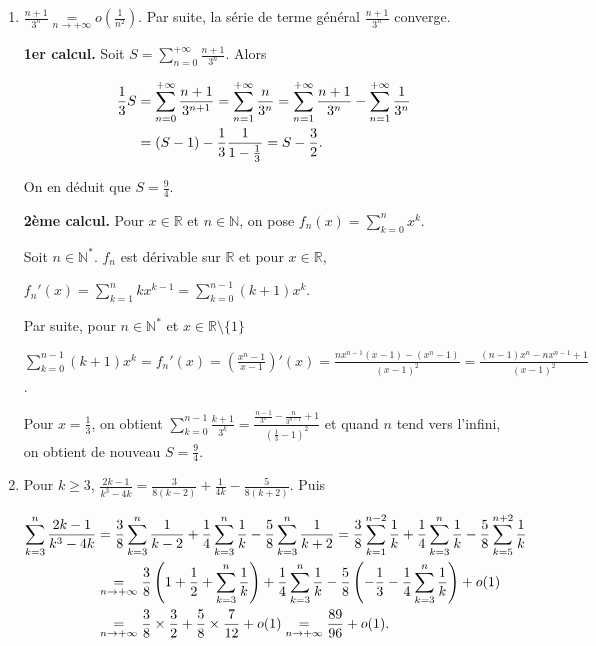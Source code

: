 \documentclass[11pt,a4paper]{article}
\newcommand{\Nn}{\mathbb{N}} \newcommand{\N}{\mathbb{N}}
\newcommand{\Rr}{\mathbb{R}} \newcommand{\R}{\mathbb{R}}
\begin{document}
\begin{enumerate}
 \item  $\frac{n+1}{3^n}\underset{n\rightarrow+\infty}{=}o\left(\frac{1}{n^2}\right)$. Par suite, la série de terme général $\frac{n+1}{3^n}$ converge.

\textbf{1er calcul.} Soit $S=\sum_{n=0}^{+\infty}\frac{n+1}{3^n}$. Alors

\begin{align*}\ensuremath
\frac{1}{3}S&=\sum_{n=0}^{+\infty}\frac{n+1}{3^{n+1}}=\sum_{n=1}^{+\infty}\frac{n}{3^{n}}=\sum_{n=1}^{+\infty}\frac{n+1}{3^{n}}-\sum_{n=1}^{+\infty}\frac{1}{3^{n}}\\
 &=(S-1)-\frac{1}{3}\frac{1}{1-\frac{1}{3}}=S-\frac{3}{2}.
\end{align*}

On en déduit que $S=\frac{9}{4}$.

\begin{center}
\end{center}

\textbf{2ème calcul.} Pour $x\in\Rr$ et $n\in\Nn$, on pose $f_n(x)=\sum_{k=0}^{n}x^k$.

Soit $n\in\Nn^*$. $f_n$ est dérivable sur $\Rr$ et pour $x\in\Rr$,

\begin{center}
$f_n'(x)=\sum_{k=1}^{n}kx^{k-1}=\sum_{k=0}^{n-1}(k+1)x^k$.
\end{center}

Par suite, pour $n\in\Nn^*$ et $x\in\Rr\setminus\{1\}$

\begin{center}
$\sum_{k=0}^{n-1}(k+1)x^k=f_n'(x)=\left(\frac{x^n-1}{x-1}\right)'(x)=\frac{nx^{n-1}(x-1)-(x^n-1)}{(x-1)^2}=\frac{(n-1)x^n-nx^{n-1}+1}{(x-1)^2}$.
\end{center}

Pour $x=\frac{1}{3}$, on obtient  $\sum_{k=0}^{n-1}\frac{k+1}{3^k}=\frac{\frac{n-1}{3^n}-\frac{n}{3^{n-1}}+1}{\left(\frac{1}{3}-1\right)^2}$ et quand $n$ tend vers l'infini, on obtient de nouveau $S=\frac{9}{4}$.

\item  Pour $k\geqslant3$, $\frac{2k-1}{k^3-4k}=\frac{3}{8(k-2)}+\frac{1}{4k}-\frac{5}{8(k+2)}$. Puis

\begin{align*}\ensuremath
\sum_{k=3}^{n}\frac{2k-1}{k^3-4k}&=\frac{3}{8}\sum_{k=3}^{n}\frac{1}{k-2}+\frac{1}{4}\sum_{k=3}^{n}\frac{1}{k}-\frac{5}{8}\sum_{k=3}^{n}\frac{1}{k+2}=\frac{3}{8}\sum_{k=1}^{n-2}\frac{1}{k}+\frac{1}{4}\sum_{k=3}^{n}\frac{1}{k}-\frac{5}{8}\sum_{k=5}^{n+2}\frac{1}{k}\\
 &\underset{n\rightarrow+\infty}{=}\frac{3}{8}\left(1+\frac{1}{2}+\sum_{k=3}^{n}\frac{1}{k}\right)+\frac{1}{4}\sum_{k=3}^{n}\frac{1}{k}-\frac{5}{8}\left(-\frac{1}{3}-\frac{1}{4}\sum_{k=3}^{n}\frac{1}{k}\right)+o(1)\\
 &\underset{n\rightarrow+\infty}{=}\frac{3}{8}\times\frac{3}{2}+\frac{5}{8}\times\frac{7}{12}+o(1)\underset{n\rightarrow+\infty}{=}\frac{89}{96}+ o(1) .
\end{align*}


\end{enumerate}
\end{document}
